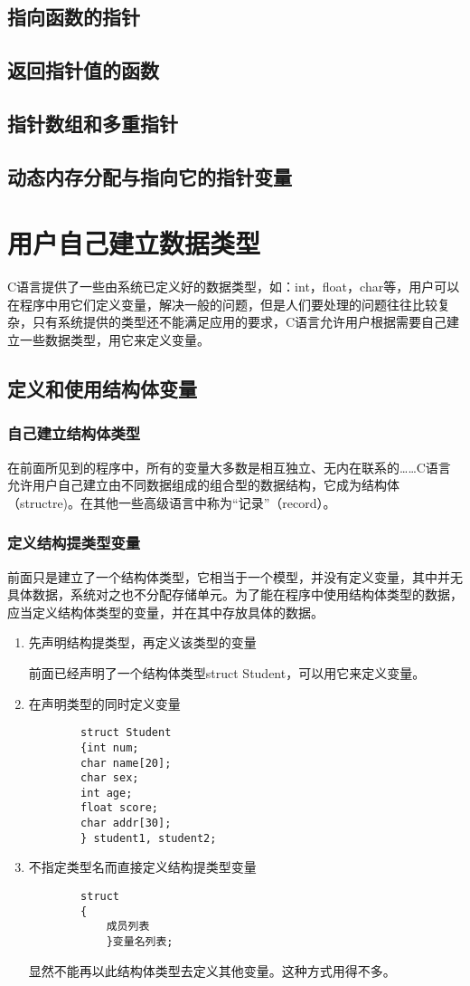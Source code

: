 \section{指向函数的指针}
\section{返回指针值的函数}
\section{指针数组和多重指针}
\section{动态内存分配与指向它的指针变量}

\chapter{用户自己建立数据类型}
C语言提供了一些由系统已定义好的数据类型，如：int，float，char等，用户可以在程序中用它们定义变量，解决一般的问题，但是人们要处理的问题往往比较复杂，只有系统提供的类型还不能满足应用的要求，C语言允许用户根据需要自己建立一些数据类型，用它来定义变量。
\section{定义和使用结构体变量}
\subsection{自己建立结构体类型}
在前面所见到的程序中，所有的变量大多数是相互独立、无内在联系的……C语言允许用户自己建立由不同数据组成的组合型的数据结构，它成为结构体（structre)。在其他一些高级语言中称为“记录”（record）。
\subsection{定义结构提类型变量}
前面只是建立了一个结构体类型，它相当于一个模型，并没有定义变量，其中并无具体数据，系统对之也不分配存储单元。为了能在程序中使用结构体类型的数据，应当定义结构体类型的变量，并在其中存放具体的数据。
\begin{enumerate}
	\item 先声明结构提类型，再定义该类型的变量

		前面已经声明了一个结构体类型struct Student，可以用它来定义变量。

	\item 在声明类型的同时定义变量
		
		\begin{lstlisting}
		struct Student
		{int num;
		char name[20];
		char sex;
		int age;
		float score;
		char addr[30];
		} student1, student2;
		\end{lstlisting}

	\item 不指定类型名而直接定义结构提类型变量
		\begin{lstlisting}
		struct 
		{
			成员列表
			}变量名列表;
		\end{lstlisting}
		显然不能再以此结构体类型去定义其他变量。这种方式用得不多。
\end{enumerate}
